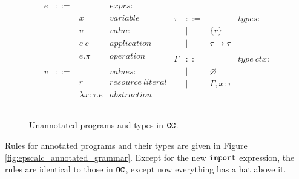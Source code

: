 \begin{figure}[h]
\vspace{-5pt}

\[
\begin{array}{lll}

\begin{array}{lllr}
e & ::= & ~ & exprs: \\
	& | & x & variable \\
	& | & v & value \\
	& | & e ~ e & application \\
	& | & e.\pi & operation \\
	&&\\

v & ::= & ~ & values: \\
	& | & r & resource~literal \\
	& | & \lambda x: \tau.e & abstraction \\
	&&\\
\end{array}

\begin{array}{lllr}

\tau & ::= & ~ & types: \\
		& | & \{ \bar r \} \\
		& | & \tau \rightarrow \tau \\ 
		&&\\

\Gamma & ::= & ~ & type~ctx: \\
				& | & \varnothing \\
				& | & \Gamma, x: \tau \\
				&&\\
				
\end{array}

\end{array}
\]

\vspace{-7pt}
\caption{Unannotated programs and types in $\mathtt{CC}$.}
\label{fig:epscalc_unannotated_grammar}
\end{figure}


Rules for annotated programs and their types are given in Figure \ref{fig:epscalc_annotated_grammar}. Except for the new $\mathtt{import}$ expression, the rules are identical to those in $\mathtt{OC}$, except now everything has a hat above it.

